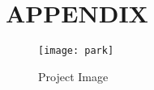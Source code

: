 \documentclass[12pt,a4paper]{report}
\begin{document}
\section*{APPENDIX}

	\begin{figure}[H]
		\begin{center}
		\texttt{[image: park]}
		\caption{Project Image}
	\end{center}
	\end{figure}
\end{document}

